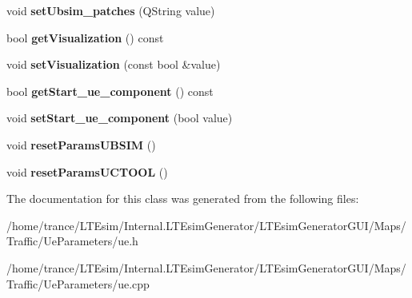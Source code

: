 \begin{DoxyCompactItemize}
\item 
void {\bfseries set\+Ubsim\+\_\+patches} (Q\+String value)\hypertarget{class_ue_a3cde0acfe92ad9741d1dae6e36f06d16}{}\label{class_ue_a3cde0acfe92ad9741d1dae6e36f06d16}

\item 
bool {\bfseries get\+Visualization} () const \hypertarget{class_ue_a131927bd7c49a679fd8be63f9aabbac0}{}\label{class_ue_a131927bd7c49a679fd8be63f9aabbac0}

\item 
void {\bfseries set\+Visualization} (const bool \&value)\hypertarget{class_ue_a0b444e91c52ae32cb35273da2b88dda5}{}\label{class_ue_a0b444e91c52ae32cb35273da2b88dda5}

\item 
bool {\bfseries get\+Start\+\_\+ue\+\_\+component} () const \hypertarget{class_ue_a12e1ddae74a6477b767b7069e7c17a50}{}\label{class_ue_a12e1ddae74a6477b767b7069e7c17a50}

\item 
void {\bfseries set\+Start\+\_\+ue\+\_\+component} (bool value)\hypertarget{class_ue_a5c7cb753a93b067adc9491b2810bbd7a}{}\label{class_ue_a5c7cb753a93b067adc9491b2810bbd7a}

\item 
void {\bfseries reset\+Params\+U\+B\+S\+IM} ()\hypertarget{class_ue_a2470c452cd91c9d17617257cb562185b}{}\label{class_ue_a2470c452cd91c9d17617257cb562185b}

\item 
void {\bfseries reset\+Params\+U\+C\+T\+O\+OL} ()\hypertarget{class_ue_a76e5edfdcba7c306db4d58e6049ba1be}{}\label{class_ue_a76e5edfdcba7c306db4d58e6049ba1be}

\end{DoxyCompactItemize}


The documentation for this class was generated from the following files\+:\begin{DoxyCompactItemize}
\item 
/home/trance/\+L\+T\+Esim/\+Internal.\+L\+T\+Esim\+Generator/\+L\+T\+Esim\+Generator\+G\+U\+I/\+Maps/\+Traffic/\+Ue\+Parameters/ue.\+h\item 
/home/trance/\+L\+T\+Esim/\+Internal.\+L\+T\+Esim\+Generator/\+L\+T\+Esim\+Generator\+G\+U\+I/\+Maps/\+Traffic/\+Ue\+Parameters/ue.\+cpp\end{DoxyCompactItemize}
